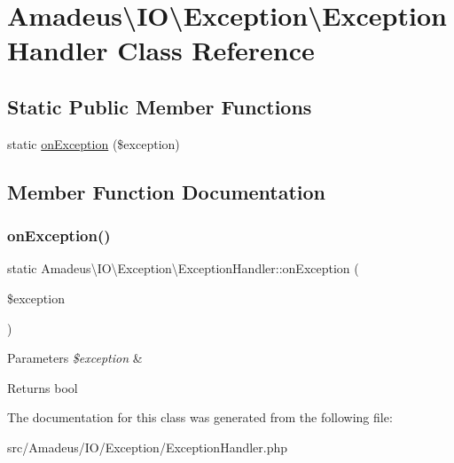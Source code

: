 \hypertarget{classAmadeus_1_1IO_1_1Exception_1_1ExceptionHandler}{}\section{Amadeus\textbackslash{}IO\textbackslash{}Exception\textbackslash{}Exception\+Handler Class Reference}
\label{classAmadeus_1_1IO_1_1Exception_1_1ExceptionHandler}
\subsection*{Static Public Member Functions}
\begin{DoxyCompactItemize}
\item 
static \hyperlink{classAmadeus_1_1IO_1_1Exception_1_1ExceptionHandler_a9d8ec2e6e02c48927edc2e5d310008f2}{on\+Exception} (\$exception)
\end{DoxyCompactItemize}


\subsection{Member Function Documentation}
\mbox{\label{classAmadeus_1_1IO_1_1Exception_1_1ExceptionHandler_a9d8ec2e6e02c48927edc2e5d310008f2}} 
\subsubsection{\texorpdfstring{on\+Exception()}{onException()}}
{\footnotesize\ttfamily static Amadeus\textbackslash{}\+I\+O\textbackslash{}\+Exception\textbackslash{}\+Exception\+Handler\+::on\+Exception (\begin{DoxyParamCaption}\item[{}]{\$exception }\end{DoxyParamCaption})\hspace{0.3cm}{\ttfamily [static]}}


\begin{DoxyParams}{Parameters}
{\em \$exception} & \\
\hline
\end{DoxyParams}
\begin{DoxyReturn}{Returns}
bool 
\end{DoxyReturn}


The documentation for this class was generated from the following file\+:\begin{DoxyCompactItemize}
\item 
src/\+Amadeus/\+I\+O/\+Exception/Exception\+Handler.\+php\end{DoxyCompactItemize}
